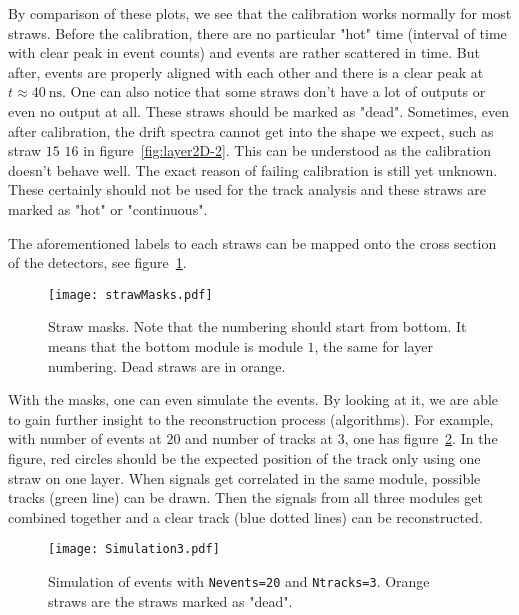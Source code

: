 \clearpage
By comparison of these plots, we see that the calibration works normally for most straws. Before the calibration, there are no particular "hot" time (interval of time with clear peak in event counts) and events are rather scattered in time. But after, events are properly aligned with each other and there is a clear peak at $t\approx\SI{40}{\nano\second}$. One can also notice that some straws don't have a lot of outputs or even no output at all. These straws should be marked as "dead". Sometimes, even after calibration, the drift spectra cannot get into the shape we expect, such as straw $15$ $16$ in figure~\ref{fig:layer2D-2}. This can be understood as the calibration doesn't behave well. The exact reason of failing calibration is still yet unknown. These certainly should not be used for the track analysis and these straws are marked as "hot" or "continuous". 

The aforementioned labels to each straws can be mapped onto the cross section of the detectors, see figure~\ref{fig:strawMasks}.
\begin{figure}[ht]
	\centering
	\texttt{[image: strawMasks.pdf]}
	\caption{Straw masks. Note that the numbering should start from bottom. It means that the bottom module is module $1$, the same for layer numbering. Dead straws are in orange.}%
	\label{fig:strawMasks}
\end{figure}

With the masks, one can even simulate the events. By looking at it, we are able to gain further insight to the reconstruction process (algorithms). For example, with number of events at $20$ and number of tracks at $3$, one has figure~\ref{fig:simu}. In the figure, red circles should be the expected position of the track only using one straw on one layer. When signals get correlated in the same module, possible tracks (green line) can be drawn. Then the signals from all three modules get combined together and a clear track (blue dotted lines) can be reconstructed.
\begin{figure}[ht]
	\centering
	\texttt{[image: Simulation3.pdf]}
	\cprotect\caption{Simulation of events with \verb|Nevents=20| and \verb|Ntracks=3|. Orange straws are the straws marked as "dead".}%
	\label{fig:simu}
\end{figure}
